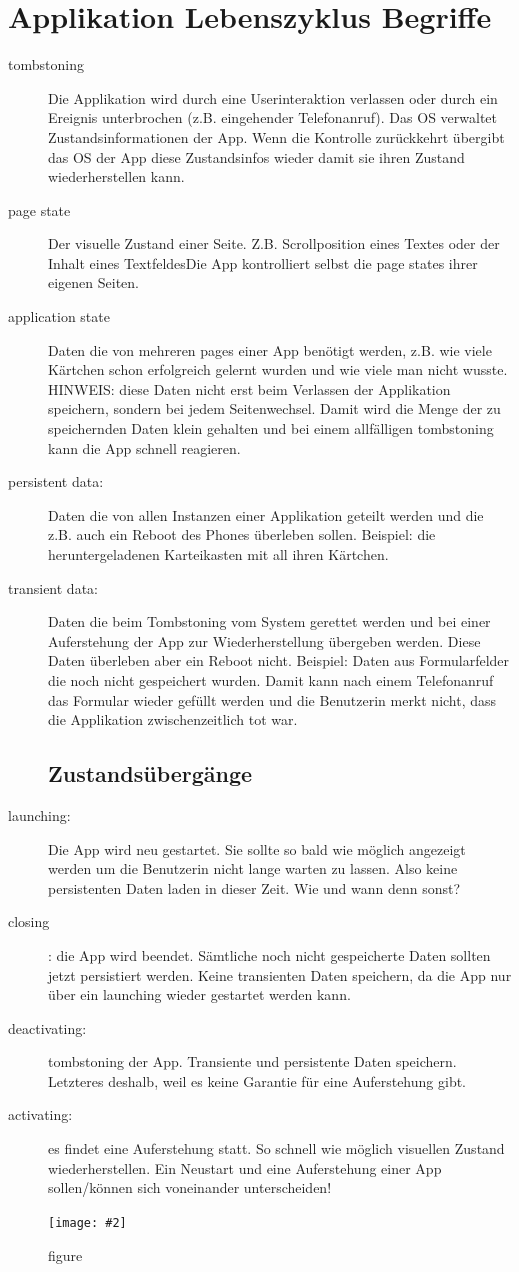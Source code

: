 \documentclass[a4paper,10pt]{scrreprt}
\newcommand{\pic}[2][figure]{\begin{figure}[h]
 \centering
 \texttt{[image: \#2]}
 \caption{#1}
\end{figure}
}
\begin{document}
\section{Applikation Lebenszyklus Begriffe}
\begin{description}
 \item [tombstoning] Die Applikation wird durch eine Userinteraktion verlassen oder durch ein Ereignis
unterbrochen (z.B. eingehender Telefonanruf). Das OS verwaltet Zustandsinformationen der App. Wenn die
Kontrolle zurückkehrt übergibt das OS der App diese Zustandsinfos wieder damit sie ihren Zustand
wiederherstellen kann.
\item[page state]Der visuelle Zustand einer Seite. Z.B. Scrollposition eines Textes oder der Inhalt eines 
TextfeldesDie App kontrolliert selbst die page states ihrer eigenen Seiten.
\item[application state]Daten die von mehreren pages einer App benötigt werden, z.B. wie viele 
Kärtchen schon
erfolgreich gelernt wurden und wie viele man nicht wusste. HINWEIS: diese Daten nicht erst beim Verlassen
der Applikation speichern, sondern bei jedem Seitenwechsel. Damit wird die Menge der zu speichernden
Daten klein gehalten und bei einem allfälligen tombstoning kann die App schnell reagieren.
\item[persistent data:] Daten die von allen Instanzen einer Applikation geteilt werden und die z.B. auch ein Reboot
des Phones überleben sollen. Beispiel: die heruntergeladenen Karteikasten mit all ihren Kärtchen.
\item[transient data:] Daten die beim Tombstoning vom System gerettet werden und bei einer Auferstehung der
App zur Wiederherstellung übergeben werden. Diese Daten überleben aber ein Reboot nicht. Beispiel:
Daten aus Formularfelder die noch nicht gespeichert wurden. Damit kann nach einem Telefonanruf das
Formular wieder gefüllt werden und die Benutzerin merkt nicht, dass die Applikation zwischenzeitlich tot
war.

\subsection{Zustandsübergänge}
\item[launching:] Die App wird neu gestartet. Sie sollte so bald wie möglich angezeigt werden um die Benutzerin
nicht lange warten zu lassen. Also keine persistenten Daten laden in dieser Zeit. Wie und wann denn sonst?
\item[closing]: die App wird beendet. Sämtliche noch nicht gespeicherte Daten sollten jetzt persistiert werden.
Keine transienten Daten speichern, da die App nur über ein launching wieder gestartet werden kann.
\item [deactivating:] tombstoning der App. Transiente und persistente Daten speichern. Letzteres deshalb, weil es
keine Garantie für eine Auferstehung gibt.
\item[activating:] es findet eine Auferstehung statt. So schnell wie möglich 
visuellen Zustand wiederherstellen. Ein
Neustart und eine Auferstehung einer App sollen/können sich voneinander unterscheiden!
\end{description}
\pic{appstate.png}
\end{document}
